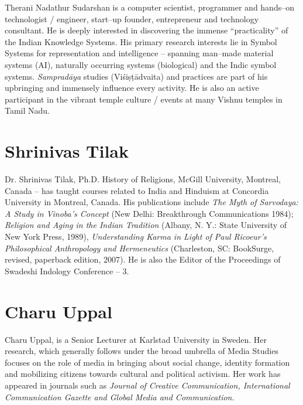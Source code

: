 Therani Nadathur Sudarshan is a computer scientist, programmer and hands–on technologist / engineer, start–up founder, entrepreneur and technology consultant. He is deeply interested in discovering the immense “practicality” of the Indian Knowledge Systems. His primary research interests lie in Symbol Systems for representation and intelligence – spanning man–made material systems (AI), naturally occurring systems (biological) and the Indic symbol systems. \textit{Sampradāya} studies (Viśiṣṭādvaita) and practices are part of his upbringing and immensely influence every activity. He is also an active participant in the vibrant temple culture / events at many Vishnu temples in Tamil Nadu.


\section*{Shrinivas Tilak}

Dr. Shrinivas Tilak, Ph.D. History of Religions, McGill University, Montreal, Canada – has taught courses related to India and Hinduism at Concordia University in Montreal, Canada. His publications include \textit{The Myth of Sarvodaya: A Study in Vinoba's Concept} (New Delhi: Breakthrough Communications 1984); \textit{Religion and Aging in the Indian Tradition} (Albany, N. Y.: State University of New York Press, 1989), \textit{Understanding Karma in Light of Paul Ricoeur's Philosophical Anthropology and Hermeneutics} (Charleston, SC: BookSurge, revised, paperback edition, 2007). He is also the Editor of the Proceedings of Swadeshi Indology Conference – 3.


\section*{Charu Uppal}

Charu Uppal, is a Senior Lecturer at Karlstad University in Sweden. Her research, which generally follows under the broad umbrella of Media Studies focuses on the role of media in bringing about social change, identity formation and mobilizing citizens towards cultural and political activism. Her work has appeared in journals such as \textit{Journal of Creative Communication, International Communication Gazette and Global Media and Communication.}

